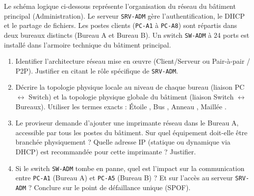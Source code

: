 \documentclass[11pt]{article}
\begin{document}
\begin{exercice}
Le schéma logique ci-dessous représente l'organisation du réseau du bâtiment principal (Administration). Le serveur \texttt{SRV-ADM} gère l'authentification, le DHCP et le partage de fichiers. Les postes clients (\texttt{PC-A1} à \texttt{PC-A8}) sont répartis dans deux bureaux distincts (Bureau A et Bureau B). Un switch \texttt{SW-ADM} à 24 ports est installé dans l'armoire technique du bâtiment principal.

\begin{center}
\end{center}

\begin{enumerate}
    \item Identifier l'architecture réseau mise en œuvre (Client/Serveur ou Pair-à-pair / P2P). Justifier en citant le rôle spécifique de \texttt{SRV-ADM}.
    \item Décrire la topologie physique locale au niveau de chaque bureau (liaison PC $\leftrightarrow$ Switch) et la topologie physique globale du bâtiment (liaison Switch $\leftrightarrow$ Bureaux). Utiliser les termes exacts : \og Étoile \fg, \og Bus \fg, \og Anneau \fg, \og Maillée \fg.
    \item Le proviseur demande d'ajouter une imprimante réseau dans le Bureau A, accessible par tous les postes du bâtiment. Sur quel équipement doit-elle être branchée physiquement ? Quelle adresse IP (statique ou dynamique via DHCP) est recommandée pour cette imprimante ? Justifier.
    \item Si le switch \texttt{SW-ADM} tombe en panne, quel est l'impact sur la communication entre \texttt{PC-A1} (Bureau A) et \texttt{PC-A5} (Bureau B) ? Et sur l'accès au serveur \texttt{SRV-ADM} ? Conclure sur le point de défaillance unique (SPOF).
\end{enumerate}
\end{exercice}
\end{document}
